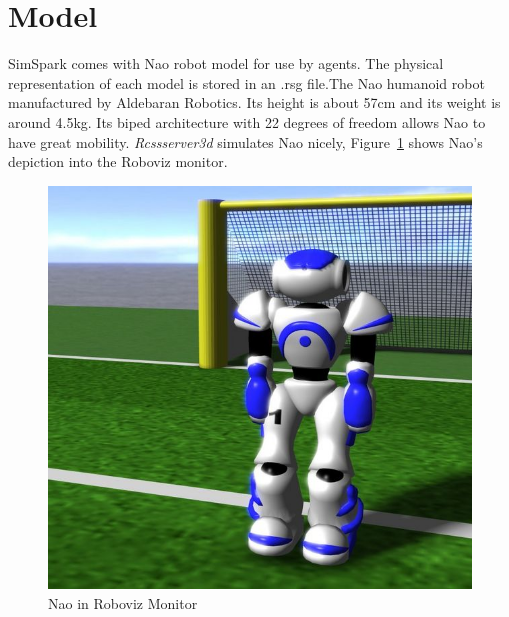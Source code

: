 \section{Model}
SimSpark comes with Nao robot model for use by agents. The physical representation of each model is stored in an .rsg file.The Nao humanoid robot manufactured by Aldebaran Robotics. Its height is about 57cm and its weight is around 4.5kg. Its biped architecture with 22 degrees of freedom allows Nao to have great mobility. \textit{Rcssserver3d} simulates Nao nicely, Figure~\ref{fig:Naoinsimulationscreen} shows Nao's depiction into the Roboviz monitor.
\begin{figure}[ht]
\centering
  \includegraphics[scale=0.3]{Chapter2/figures/629px-Models-nao.jpg}
  \caption{Nao in Roboviz Monitor} 
  \label{fig:Naoinsimulationscreen}
\end{figure}
